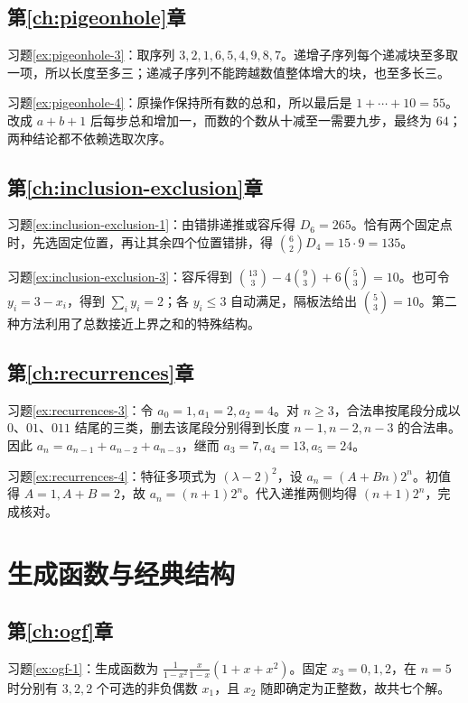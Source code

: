\subsection{第\ref{ch:pigeonhole}章}

习题\ref{ex:pigeonhole-3}：取序列 $3,2,1,6,5,4,9,8,7$。递增子序列每个递减块至多取一项，所以长度至多三；递减子序列不能跨越数值整体增大的块，也至多长三。

习题\ref{ex:pigeonhole-4}：原操作保持所有数的总和，所以最后是 $1+\cdots+10=55$。改成 $a+b+1$ 后每步总和增加一，而数的个数从十减至一需要九步，最终为 $64$；两种结论都不依赖选取次序。

\subsection{第\ref{ch:inclusion-exclusion}章}

习题\ref{ex:inclusion-exclusion-1}：由错排递推或容斥得 $D_6=265$。恰有两个固定点时，先选固定位置，再让其余四个位置错排，得 $\binom62D_4=15\cdot9=135$。

习题\ref{ex:inclusion-exclusion-3}：容斥得到 $\binom{13}{3}-4\binom93+6\binom53=10$。也可令 $y_i=3-x_i$，得到 $\sum_i y_i=2$；各 $y_i\le3$ 自动满足，隔板法给出 $\binom53=10$。第二种方法利用了总数接近上界之和的特殊结构。

\subsection{第\ref{ch:recurrences}章}

习题\ref{ex:recurrences-3}：令 $a_0=1,a_1=2,a_2=4$。对 $n\ge3$，合法串按尾段分成以 $0$、$01$、$011$ 结尾的三类，删去该尾段分别得到长度 $n-1,n-2,n-3$ 的合法串。因此 $a_n=a_{n-1}+a_{n-2}+a_{n-3}$，继而 $a_3=7,a_4=13,a_5=24$。

习题\ref{ex:recurrences-4}：特征多项式为 $(\lambda-2)^2$，设 $a_n=(A+Bn)2^n$。初值得 $A=1,A+B=2$，故 $a_n=(n+1)2^n$。代入递推两侧均得 $(n+1)2^n$，完成核对。

\section{生成函数与经典结构}

\subsection{第\ref{ch:ogf}章}

习题\ref{ex:ogf-1}：生成函数为 $\frac1{1-x^2}\frac{x}{1-x}(1+x+x^2)$。固定 $x_3=0,1,2$，在 $n=5$ 时分别有 $3,2,2$ 个可选的非负偶数 $x_1$，且 $x_2$ 随即确定为正整数，故共七个解。

